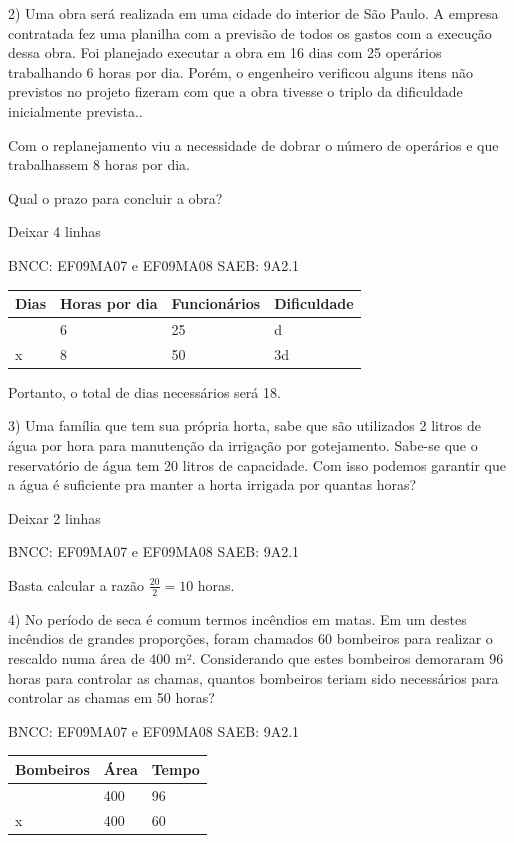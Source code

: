 \begin{escolha}
{{{\begin{escolha}
{2) Uma obra será realizada em uma cidade do interior de São Paulo. A
empresa contratada fez uma planilha com a previsão de todos os gastos
com a execução dessa obra. Foi planejado executar a obra em 16 dias com
25 operários trabalhando 6 horas por dia. Porém, o engenheiro verificou
alguns itens não previstos no projeto fizeram com que a obra tivesse o
triplo da dificuldade inicialmente prevista..

Com o replanejamento viu a necessidade de dobrar o número de operários e
que trabalhassem 8 horas por dia.

Qual o prazo para concluir a obra?

Deixar 4 linhas

BNCC: EF09MA07 e EF09MA08 SAEB: 9A2.1

\begin{longtable}[]{@{}llll@{}}
\toprule\noalign{}
Dias & Horas por dia & Funcionários & Dificuldade \\
\midrule\noalign{}
\endhead
\bottomrule\noalign{}
\endlastfoot
16 & 6 & 25 & d \\
x & 8 & 50 & 3d \\
\end{longtable}

Portanto, o total de dias necessários será 18.

3) Uma família que tem sua própria horta, sabe que são utilizados 2
litros de água por hora para manutenção da irrigação por gotejamento.
Sabe-se que o reservatório de água tem 20 litros de capacidade. Com isso
podemos garantir que a água é suficiente pra manter a horta irrigada por
quantas horas?

Deixar 2 linhas

BNCC: EF09MA07 e EF09MA08 SAEB: 9A2.1

Basta calcular a razão \(\frac{20}{2} = 10\) horas.

4) No período de seca é comum termos incêndios em matas. Em um destes
incêndios de grandes proporções, foram chamados 60 bombeiros para
realizar o rescaldo numa área de 400 m². Considerando que estes
bombeiros demoraram 96 horas para controlar as chamas, quantos bombeiros
teriam sido necessários para controlar as chamas em 50 horas?

BNCC: EF09MA07 e EF09MA08 SAEB: 9A2.1

\begin{longtable}[]{@{}lll@{}}
\toprule\noalign{}
Bombeiros & Área & Tempo \\
\midrule\noalign{}
\endhead
\bottomrule\noalign{}
\endlastfoot
40 & 400 & 96 \\
x & 400 & 60 \\
\end{longtable}

}
\end{escolha}}}}
\end{escolha}
